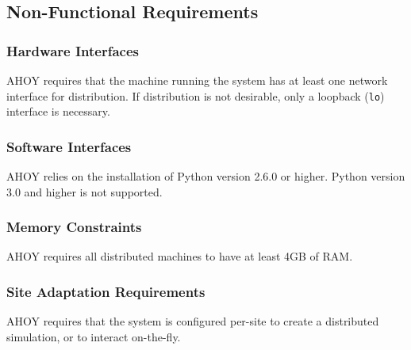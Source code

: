 \documentclass[titlepage]{article}
\begin{document}

\subsection{Non-Functional Requirements} 

\subsubsection{Hardware Interfaces%
  \label{hardware-interfaces}%
}

AHOY requires that the machine running the system has at least one network interface for distribution.  If distribution is not desirable, only a loopback (\texttt{lo}) interface is necessary.

\subsubsection{Software Interfaces%
  \label{software-interfaces}%
}

AHOY relies on the installation of Python version 2.6.0 or higher.  Python version 3.0 and higher is not supported.


\subsubsection{Memory Constraints%
  \label{memory-constraints}%
}

AHOY requires all distributed machines to have at least 4GB of RAM.


\subsubsection{Site Adaptation Requirements%
  \label{site-adaptation-requirements}%
}

AHOY requires that the system is configured per-site to create a distributed simulation, or to interact on-the-fly.

\end{document}
